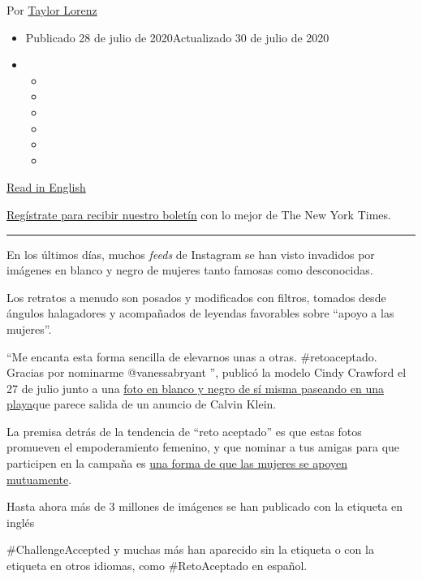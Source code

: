 Por \href{https://www.nytimes.com/by/taylor-lorenz}{Taylor Lorenz}

\begin{itemize}
\item
  Publicado 28 de julio de 2020Actualizado 30 de julio de 2020
\item
  \begin{itemize}
  \item
  \item
  \item
  \item
  \item
  \item
  \end{itemize}
\end{itemize}

\href{https://www.nytimes.com/2020/07/27/style/challenge-accepted-instagram.html}{Read
in English}

\href{https://www.nytimes.com/newsletters/el-times}{Regístrate para
recibir nuestro boletín} con lo mejor de The New York Times.

\begin{center}\rule{0.5\linewidth}{\linethickness}\end{center}

En los últimos días, muchos \emph{feeds} de Instagram se han visto
invadidos por imágenes en blanco y negro de mujeres tanto famosas como
desconocidas.

Los retratos a menudo son posados y modificados con filtros, tomados
desde ángulos halagadores y acompañados de leyendas favorables sobre
``apoyo a las mujeres''.

``Me encanta esta forma sencilla de elevarnos unas a otras.
\#retoaceptado. Gracias por nominarme @vanessabryant '', publicó la
modelo Cindy Crawford el 27 de julio junto a una
\href{https://www.instagram.com/p/CDJnHlQFuQi/?igshid=1vzk7hu5crx15}{foto
en blanco y negro de sí misma paseando en una playa}que parece salida de
un anuncio de Calvin Klein.

La premisa detrás de la tendencia de ``reto aceptado'' es que estas
fotos promueven el empoderamiento femenino, y que nominar a tus amigas
para que participen en la campaña es
\href{https://twitter.com/SoniAggarwal/status/1287784564262223872}{una
forma de que las mujeres se apoyen mutuamente}.

Hasta ahora más de 3 millones de imágenes se han publicado con la
etiqueta en inglés

\#ChallengeAccepted y muchas más han aparecido sin la etiqueta o con la
etiqueta en otros idiomas, como \#RetoAceptado en español.

